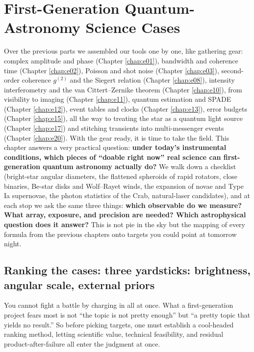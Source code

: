 \chapter{First-Generation Quantum-Astronomy Science Cases}
\label{chap:e25}

\begin{chapteropening}
Over the previous parts we assembled our tools one by one, like gathering gear: complex amplitude and phase (Chapter \ref{chap:e01}), bandwidth and coherence time (Chapter \ref{chap:e02}), Poisson and shot noise (Chapter \ref{chap:e03}), second-order coherence \(g^{(2)}\) and the Siegert relation (Chapter \ref{chap:e08}), intensity interferometry and the van Cittert--Zernike theorem (Chapter \ref{chap:e10}), from visibility to imaging (Chapter \ref{chap:e11}), quantum estimation and SPADE (Chapter \ref{chap:e12}), event tables and clocks (Chapter \ref{chap:e13}), error budgets (Chapter \ref{chap:e15}), all the way to treating the star as a quantum light source (Chapter \ref{chap:e17}) and stitching transients into multi-messenger events (Chapter \ref{chap:e20}). With the gear ready, it is time to take the field. This chapter answers a very practical question: \textbf{under today's instrumental conditions, which pieces of ``doable right now'' real science can first-generation quantum astronomy actually do?} We walk down a checklist (bright-star angular diameters, the flattened spheroids of rapid rotators, close binaries, Be-star disks and Wolf--Rayet winds, the expansion of novae and Type Ia supernovae, the photon statistics of the Crab, natural-laser candidates), and at each stop we ask the same three things: \textbf{which observable do we measure? What array, exposure, and precision are needed? Which astrophysical question does it answer?} This is not pie in the sky but the mapping of every formula from the previous chapters onto targets you could point at tomorrow night.
\end{chapteropening}

\section{Ranking the cases: three yardsticks: brightness, angular scale, external priors}
\label{sec:e25-triage}

You cannot fight a battle by charging in all at once. What a first-generation project fears most is not ``the topic is not pretty enough'' but ``a pretty topic that yields no result.'' So before picking targets, one must establish a cool-headed ranking method, letting scientific value, technical feasibility, and residual product-after-failure all enter the judgment at once.

